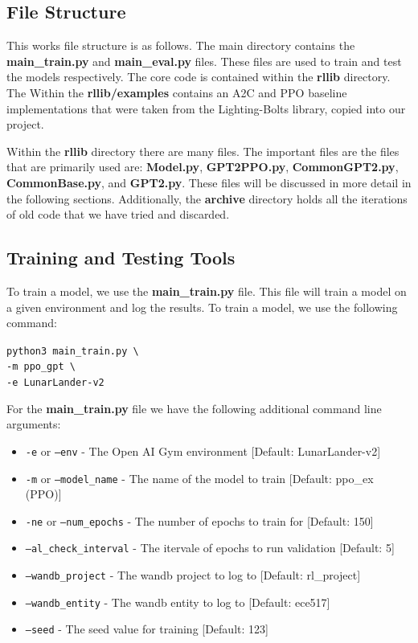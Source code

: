 \subsection{File Structure}

This works file structure is as follows. The main directory contains the \textbf{main\_train.py} and \textbf{main\_eval.py} files.
These files are used to train and test the models respectively. The core code is contained within the \textbf{rllib} directory.
The Within the \textbf{rllib/examples} contains an A2C and PPO baseline implementations that were taken from the Lighting-Bolts library,
copied into our project.

Within the \textbf{rllib} directory there are many files. The important files are the files that are primarily used
are: \textbf{Model.py}, \textbf{GPT2PPO.py}, \textbf{CommonGPT2.py}, \textbf{CommonBase.py}, and \textbf{GPT2.py}.
These files will be discussed in more detail in the following sections.
Additionally, the \textbf{archive} directory holds all the iterations of old code that we have tried and discarded.

\subsection{Training and Testing Tools}
To train a model, we use the \textbf{main\_train.py} file. This file will train a model on a given environment and log the results.
To train a model, we use the following command:
\begin{center}
    \texttt{python3 main\_train.py \textbackslash \\}
    \texttt{-m ppo\_gpt \textbackslash \\}
    \texttt{-e LunarLander-v2}
\end{center}

For the \textbf{main\_train.py} file we have the following additional command line arguments:
\begin{itemize}
    \item \texttt{-e} or \texttt{--env} - The Open AI Gym environment [Default: LunarLander-v2]
    \item \texttt{-m} or \texttt{--model\_name} - The name of the model to train [Default: ppo\_ex (PPO)]
    \item \texttt{-ne} or \texttt{--num\_epochs} - The number of epochs to train for [Default: 150]
    \item \texttt{--al\_check\_interval} - The itervale of epochs to run validation [Default: 5]
    \item \texttt{--wandb\_project} - The wandb project to log to [Default: rl\_project]
    \item \texttt{--wandb\_entity} - The wandb entity to log to [Default: ece517]
    \item \texttt{--seed} - The seed value for training [Default: 123]
\end{itemize}

